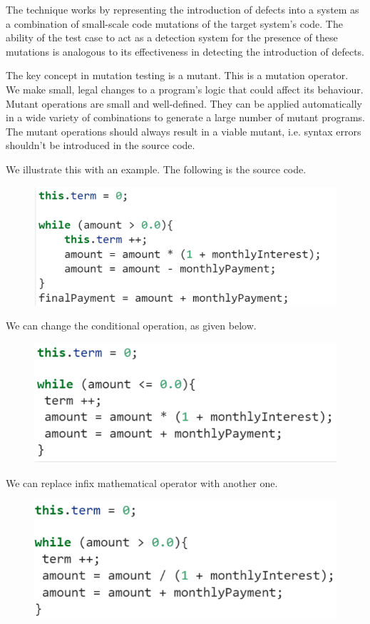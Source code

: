 \documentclass[a4paper, openany]{memoir}
\begin{document}
The technique works by representing the introduction of defects into a system as a combination of small-scale code mutations of the target system's code. The ability of the test case to act as a detection system for the presence of these mutations is analogous to its effectiveness in detecting the introduction of defects.

The key concept in mutation testing is a mutant. This is a mutation operator. We make small, legal changes to a program's logic that could affect its behaviour. Mutant operations are small and well-defined. They can be applied automatically in a wide variety of combinations to generate a large number of mutant programs. The mutant operations should always result in a viable mutant, i.e. syntax errors shouldn't be introduced in the source code.

We illustrate this with an example. The following is the source code.
\begin{figure}[H]
    \centering
    \includegraphics[scale=0.5]{src/12 Mutation 1.PNG}
\end{figure}
\noindent We can change the conditional operation, as given below.
\begin{figure}[H]
    \centering
    \includegraphics[scale=0.5]{src/12 Mutation 2.PNG}
\end{figure}
\noindent We can replace infix mathematical operator with another one.
\begin{figure}[H]
    \centering
    \includegraphics[scale=0.5]{src/12 Mutation 3.PNG}
\end{figure}
\end{document}
